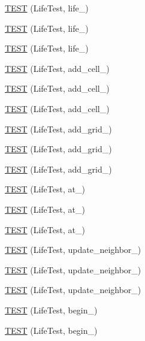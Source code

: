 \begin{DoxyCompactItemize}
\item 
\hyperlink{TestLife_8c_09_09_a1a58fe66848113701c0c805690d1b123}{T\-E\-S\-T} (Life\-Test, life\-\_)
\item 
\hyperlink{TestLife_8c_09_09_ac7afd3e0087a6cf4cd57c1a6edf7bbc3}{T\-E\-S\-T} (Life\-Test, life\-\_)
\item 
\hyperlink{TestLife_8c_09_09_a1f0d17e5d33e9500a01fa061b6b81bd9}{T\-E\-S\-T} (Life\-Test, life\-\_)
\item 
\hyperlink{TestLife_8c_09_09_a846a502c745733ab1224ad9136b5b328}{T\-E\-S\-T} (Life\-Test, add\-\_\-cell\-\_)
\item 
\hyperlink{TestLife_8c_09_09_ab87f690c3a9e7c65409cff5795240210}{T\-E\-S\-T} (Life\-Test, add\-\_\-cell\-\_)
\item 
\hyperlink{TestLife_8c_09_09_a3dbc3c22c84f73918b4e385137b87ddd}{T\-E\-S\-T} (Life\-Test, add\-\_\-cell\-\_)
\item 
\hyperlink{TestLife_8c_09_09_aebddaca0766638b417b9b4789d5d9845}{T\-E\-S\-T} (Life\-Test, add\-\_\-grid\-\_)
\item 
\hyperlink{TestLife_8c_09_09_a74db7e63a831edd39f26534851a0ac9d}{T\-E\-S\-T} (Life\-Test, add\-\_\-grid\-\_)
\item 
\hyperlink{TestLife_8c_09_09_a12816256bde9af37592f78ad189ff008}{T\-E\-S\-T} (Life\-Test, add\-\_\-grid\-\_)
\item 
\hyperlink{TestLife_8c_09_09_a583a7e4594298e5f096d47d5fd0c6683}{T\-E\-S\-T} (Life\-Test, at\-\_)
\item 
\hyperlink{TestLife_8c_09_09_aa16227100fe4ef3d2a70f2ac32c8b30a}{T\-E\-S\-T} (Life\-Test, at\-\_)
\item 
\hyperlink{TestLife_8c_09_09_a6fc2d4d2b439eae727ee90f52e7f6f94}{T\-E\-S\-T} (Life\-Test, at\-\_)
\item 
\hyperlink{TestLife_8c_09_09_a24bd6364fa31713f82d6da61c8967b25}{T\-E\-S\-T} (Life\-Test, update\-\_\-neighbor\-\_)
\item 
\hyperlink{TestLife_8c_09_09_ae952b14d17e799d18482db0568c5c5d5}{T\-E\-S\-T} (Life\-Test, update\-\_\-neighbor\-\_)
\item 
\hyperlink{TestLife_8c_09_09_aa07c3f02e7d3b07b73231f303f7d8cd5}{T\-E\-S\-T} (Life\-Test, update\-\_\-neighbor\-\_)
\item 
\hyperlink{TestLife_8c_09_09_a014676f1a668faa0ce9099e11385cee6}{T\-E\-S\-T} (Life\-Test, begin\-\_)
\item 
\hyperlink{TestLife_8c_09_09_ac6b2fcdc2202d714ecae4e83a8879e45}{T\-E\-S\-T} (Life\-Test, begin\-\_)

\end{DoxyCompactItemize}
